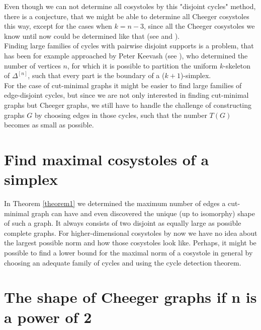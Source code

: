

Even though we can not determine all cosystoles by this "disjoint cycles" method, there is a conjecture, that we might be able to determine all Cheeger cosystoles this way, except for the cases when \(k=n-3\), since all the Cheeger cosystoles we know until now could be determined like that (see \cite{1} and \cite{6}).\\
Finding large families of cycles with pairwise disjoint supports is a problem, that has been for example approached by Peter Keevash (see \cite{11}), who determined the number of vertices \(n\), for which it is possible to partition the uniform \(k\)-skeleton of \(\Delta^{[n]}\), such that every part is the boundary of a (\(k+1\))-simplex.\\
For the case of cut-minimal graphs it might be easier to find large families of edge-disjoint cycles, but since we are not only interested in finding cut-minimal graphs but Cheeger graphs, we still have to handle the challenge of constructing graphs \(G\) by choosing edges in those cycles, such that the number \(T(G)\) becomes as small as possible.

\section{Find maximal cosystoles of a simplex}

In Theorem \ref{theorem1} we determined the maximum number of edges a cut-minimal graph can have and even discovered the unique (up to isomorphy) shape of such a graph. It always consists of two disjoint as equally large as possible complete graphs. For higher-dimensional cosystoles by now we have no idea about the largest possible norm and how those cosystoles look like. Perhaps, it might be possible to find a lower bound for the maximal norm of a cosystole in general by choosing an adequate family of cycles and using the cycle detection theorem.

\section{The shape of Cheeger graphs if n is a power of 2}

